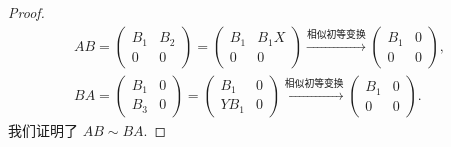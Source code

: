 \documentclass[../../main.tex]{subfiles}
\begin{document}
\begin{proof}
\begin{gather*}
AB = \begin{pmatrix} B_1 & B_2 \\ 0 & 0 \end{pmatrix} = \begin{pmatrix} B_1 & B_1X \\ 0 & 0 \end{pmatrix} \xrightarrow{\hyperref[proposition:相似初等变换]{\text{相似初等变换}}} \begin{pmatrix} B_1 & 0 \\ 0 & 0 \end{pmatrix},
\\
BA = \begin{pmatrix} B_1 & 0 \\ B_3 & 0 \end{pmatrix} = \begin{pmatrix} B_1 & 0 \\ YB_1 & 0 \end{pmatrix} \xrightarrow{\hyperref[proposition:相似初等变换]{\text{相似初等变换}}} \begin{pmatrix} B_1 & 0 \\ 0 & 0 \end{pmatrix}.
\end{gather*}
我们证明了 \( AB \sim BA \).

\end{proof}
\end{document}
